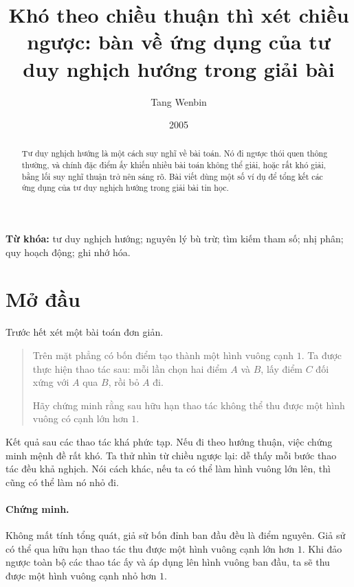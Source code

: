 \documentclass[11pt]{article}
\title{Khó theo chiều thuận thì xét chiều ngược: bàn về ứng dụng của tư duy nghịch hướng trong giải bài}
\author{Tang Wenbin}
\date{2005}
\begin{document}
\maketitle


\renewcommand{\abstractname}{Tóm tắt}
\begin{abstract}
Tư duy nghịch hướng là một cách suy nghĩ về bài toán. Nó đi ngược thói quen
thông thường, và chính đặc điểm ấy khiến nhiều bài toán không thể giải, hoặc
rất khó giải, bằng lối suy nghĩ thuận trở nên sáng rõ. Bài viết dùng một số
ví dụ để tổng kết các ứng dụng của tư duy nghịch hướng trong giải bài tin học.
\end{abstract}

\noindent\textbf{Từ khóa:} tư duy nghịch hướng; nguyên lý bù trừ; tìm kiếm
tham số; nhị phân; quy hoạch động; ghi nhớ hóa.

\section{Mở đầu}

Trước hết xét một bài toán đơn giản.

\begin{quote}
Trên mặt phẳng có bốn điểm tạo thành một hình vuông cạnh $1$. Ta được thực
hiện thao tác sau: mỗi lần chọn hai điểm $A$ và $B$, lấy điểm $C$ đối xứng
với $A$ qua $B$, rồi bỏ $A$ đi.

Hãy chứng minh rằng sau hữu hạn thao tác không thể thu được một hình vuông có
cạnh lớn hơn $1$.
\end{quote}

Kết quả sau các thao tác khá phức tạp. Nếu đi theo hướng thuận, việc chứng
minh mệnh đề rất khó. Ta thử nhìn từ chiều ngược lại: dễ thấy mỗi bước thao
tác đều khả nghịch. Nói cách khác, nếu ta có thể làm hình vuông lớn lên, thì
cũng có thể làm nó nhỏ đi.

\paragraph{Chứng minh.}
Không mất tính tổng quát, giả sử bốn đỉnh ban đầu đều là điểm nguyên. Giả sử
có thể qua hữu hạn thao tác thu được một hình vuông cạnh lớn hơn $1$. Khi đảo
ngược toàn bộ các thao tác ấy và áp dụng lên hình vuông ban đầu, ta sẽ thu
được một hình vuông cạnh nhỏ hơn $1$.
\end{document}
